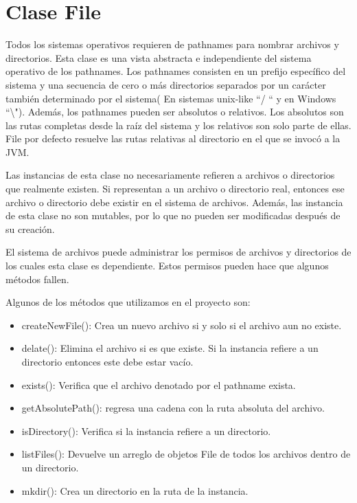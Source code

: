 \documentclass[11pt]{article}
\begin{document}
\section{Clase File}
Todos los sistemas operativos requieren de pathnames para nombrar archivos y directorios. Esta clase es una vista abstracta e independiente del sistema operativo de los pathnames. Los pathnames consisten en un prefijo específico del sistema y una secuencia de cero o más directorios separados por un carácter también determinado por el sistema( En sistemas unix-like ``/ `` y en Windows ``\textbackslash"). Además, los pathnames pueden ser absolutos o relativos. Los absolutos son las rutas completas desde la raíz del sistema y los relativos son solo parte de ellas. File por defecto resuelve las rutas relativas al directorio en el que se invocó a la JVM.  
\par
Las instancias de esta clase no necesariamente refieren a archivos o directorios que realmente existen. Si representan a un archivo o directorio real, entonces ese archivo o directorio debe existir en el sistema de archivos. Además, las instancia de esta clase no son mutables, por lo que no pueden ser modificadas después de su creación.
\par 
El sistema de archivos puede administrar los permisos de archivos y directorios de los cuales esta clase es dependiente. Estos permisos pueden hace que algunos métodos fallen. 

Algunos de los métodos que utilizamos en el proyecto son:

\begin{itemize}
\item createNewFile(): Crea un nuevo archivo si y solo si el archivo aun no existe.
\item delate(): Elimina el archivo si es que existe. Si la instancia refiere a un directorio entonces este debe estar vacío.
\item exists(): Verifica que el archivo denotado por el pathname exista.
\item getAbsolutePath(): regresa una cadena con la ruta absoluta del archivo.
\item isDirectory(): Verifica si la instancia refiere a un directorio.
\item listFiles(): Devuelve un arreglo de objetos File de todos los archivos dentro de un directorio.
\item mkdir(): Crea un directorio en la ruta de la instancia.

\end{itemize}
\end{document}
